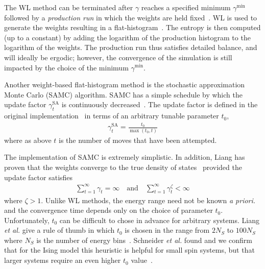The WL method can be terminated after $\gamma$ reaches a specified
minimum $\gamma^{\min}$ followed by a \emph{production run} in which the
weights are held fixed~\cite{gross2018massively}. WL is used to
generate the weights resulting in a
flat-histogram~\cite{janke2017generalized}.  The entropy is then
computed (up to a constant) by adding the logarithm of the production
histogram to the logarithm of the weights.  The production run thus
satisfies detailed balance, and will ideally be ergodic; however, the
convergence of the simulation is still impacted by the choice of the
minimum $\gamma^{\min}$.

Another weight-based flat-histogram method is
the stochastic approximation Monte Carlo (SAMC) algorithm. SAMC has a simple
schedule by which the update factor $\gamma^{\text{SA}}_t$ is continuously
decreased~\cite{liang2007stochastic, werlich2015stochastic,
schneider2017convergence}.  The update factor is defined in the
original implementation~\cite{liang2007stochastic} in terms of an
arbitrary tunable parameter $t_0$,
\begin{align}
\gamma_{t}^{\text{SA}} =\frac{t_0}{\max(t_0,t)}
\end{align}
where as above $t$ is the number of moves that have been attempted.

The implementation of SAMC is extremely simplistic.
In addition, Liang has proven that the weights converge to the true
density of states~\cite{liang2006theory, liang2007stochastic,
liang2009improving} provided the update factor satisfies
\begin{align}
\sum_{t=1}^\infty \gamma_{t} = \infty \quad\textrm{and}\quad
\sum_{t=1}^\infty \gamma_{t}^\zeta < \infty
\end{align}
where $\zeta > 1$.  Unlike WL methods, the energy range need not be
known \emph{a priori.} and the convergence time depends only on the choice of
parameter $t_0$.
Unfortunately, $t_0$ can be difficult to chose in advance
for arbitrary systems.
Liang \emph{et al.} give a rule of thumb in
which $t_0$ is chosen in the range from $2N_S$ to $100N_S$ where $N_S$
is the number of energy bins~\cite{liang2007stochastic}.  Schneider
\emph{et al.} found and we confirm that for the Ising model this heuristic is helpful for small spin systems, but that larger systems require an even higher
$t_0$ value~\cite{schneider2017convergence}.

